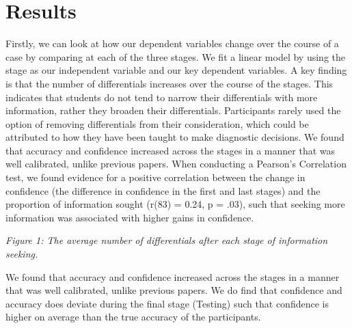 \documentclass[a4paper, nobind]{templates/ociamthesis}
\begin{document}
\section*{Results}\label{results}

Firstly, we can look at how our dependent variables change over the course of a case by comparing at each of the three stages. We fit a linear model by using the stage as our independent variable and our key dependent variables. A key finding is that the number of differentials increases over the course of the stages. This indicates that students do not tend to narrow their differentials with more information, rather they broaden their differentials. Participants rarely used the option of removing differentials from their consideration, which could be attributed to how they have been taught to make diagnostic decisions. We found that accuracy and confidence increased across the stages in a manner that was well calibrated, unlike previous papers. When conducting a Pearson's Correlation test, we found evidence for a positive correlation between the change in confidence (the difference in confidence in the first and last stages) and the proportion of information sought (r(83) = 0.24, p = .03), such that seeking more information was associated with higher gains in confidence.

\emph{Figure 1: The average number of differentials after each stage of information seeking.}

We found that accuracy and confidence increased across the stages in a manner that was well calibrated, unlike previous papers. We do find that confidence and accuracy does deviate during the final stage (Testing) such that confidence is higher on average than the true accuracy of the participants.
\end{document}
